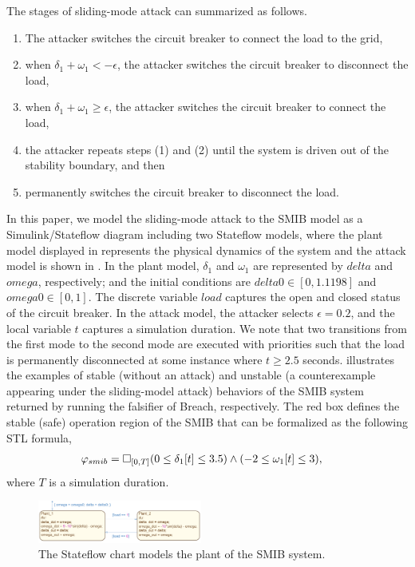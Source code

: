 The stages of sliding-mode attack can summarized as follows.
\begin{enumerate}
	\item The attacker switches the circuit breaker to connect the load to the grid,
	\item when $\delta_1 + \omega_1 < -\epsilon$, the attacker switches the circuit breaker to disconnect the load, 
  \item when $\delta_1 + \omega_1 \geq \epsilon$, the attacker switches the circuit breaker to connect the load,
  \item the attacker repeats steps (1) and (2) until the system is driven out of the stability boundary, and then
  \item permanently switches the circuit breaker to disconnect the load.
\end{enumerate}
%
In this paper, we model the sliding-mode attack to the SMIB model as a Simulink/Stateflow diagram including two Stateflow models, where the plant model displayed in  represents the physical dynamics of the system and the attack model is shown in . 
%
In the plant model, $\delta_1$ and $\omega_1$ are represented by $delta$ and $omega$, respectively; and the initial conditions are $delta0 \in [0, 1.1198]$ and $omega0 \in [0, 1]$. The discrete variable $load$ captures the open and closed status of the circuit breaker.
%
In the attack model, the attacker selects $\epsilon = 0.2$, and the local variable $t$ captures a simulation duration. We note that two transitions from the first mode to the second mode are executed with priorities such that the load is permanently disconnected at some instance where $t \geq 2.5$ seconds. 
%
%
 illustrates the examples of stable (\ie without an attack) and unstable (\ie a counterexample appearing under the sliding-model attack) behaviors of the SMIB system returned by running the falsifier of Breach, respectively. The red box defines the stable (safe) operation region of the SMIB that can be formalized as the following STL formula, 
%
\begin{align} 
\vspace{-1em}
	\varphi_{smib} & = \Box_{[0, T]} (0 \leq \delta_1[t] \leq 3.5) \wedge (-2 \leq \omega_1[t] \leq 3),\formlabel{smib_stl}
\end{align} 
where $T$ is a simulation duration.   
%
\begin{figure}[t!]%
	\centering%
    \includegraphics[width=0.48\textwidth]{image/smib_plant_model}%
	\caption{The Stateflow chart models the plant of the SMIB system.}%
\end{figure}%

